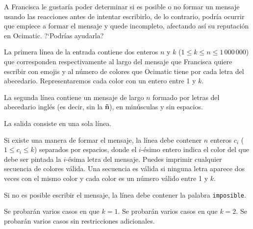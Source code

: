 \documentclass{oci}
\newcommand{\platform}{Ocimatic}
\newcommand{\hero}{Francisca}
\begin{document}
\begin{problemDescription}
A \hero{} le gustaría poder determinar si es posible o no formar un mensaje
usando las reacciones antes de intentar escribirlo, de lo contrario,
podría ocurrir que empiece a formar el mensaje y quede incompleto, afectando
así su reputación en \platform{}.
%
?`Podrías ayudarla?

\end{problemDescription}

\begin{inputDescription}
La primera línea de la entrada contiene dos enteros $n$ y $k$ ($1 \le k \le n \le 1\,000\,000$)
que corresponden respectivamente al largo del mensaje que \hero{} quiere escribir
con emojis y al número de colores que \platform{} tiene por cada letra del abecedario.
%
Representaremos cada color con un entero entre 1 y $k$.

La segunda línea contiene un mensaje de largo $n$ formado por letras del abecedario
inglés (es decir, sin la \textbf{ñ}), en minúsculas y sin espacios.
\end{inputDescription}

\begin{outputDescription}
La salida consiste en una sola línea.

Si existe una manera de formar el mensaje, la línea debe contener $n$
enteros $c_i$ ($1 \le c_i \le k$) separados por espacios,
donde el $i$-ésimo entero indica el color del que debe ser pintada la $i$-ésima
letra del mensaje.
%
Puedes imprimir cualquier secuencia de colores válida.
%
Una secuencia es válida si ninguna letra aparece dos veces con el
mismo color y cada color es un número válido entre 1 y $k$.

Si no es posible escribir el mensaje, la línea debe contener la palabra \texttt{imposible}.
\end{outputDescription}

\begin{scoreDescription}
  Se probarán varios casos en que $k = 1$.
  Se probarán varios casos en que $k = 2$.
  Se probarán varios casos sin restricciones adicionales.
\end{scoreDescription}

\begin{sampleDescription}
\end{sampleDescription}
\end{document}
